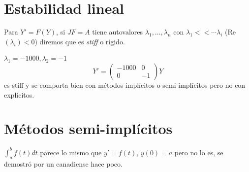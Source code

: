 \section{Estabilidad lineal}
\begin{defi}
Para $Y' = F(Y)$, si $JF=A$ tiene autovalores $\lambda_1, \ldots, \lambda_n$ con $\lambda_1 << \cdots \lambda_i$ (Re$(\lambda_i)<0$) diremos que es \textit{stiff} o r\'igido. 
\end{defi}
\begin{ejem}
    $\lambda_1=-1000, \lambda_2=-1$
    $$Y' = \begin{pmatrix}
        -1000 & 0 \\ 0 & -1
    \end{pmatrix} Y$$
    es stiff y se comporta bien con m\'etodos impl\'icitos o semi-impl\'icitos pero no con expl\'icitos.
\end{ejem}
\section{M\'etodos semi-impl\'icitos}
$\displaystyle \int_a^b f(t) dt $ parece lo mismo que $y'=f(t), \, y(0)=a$ pero no lo es, se demostr\'o por un canadiense hace poco.
\newpage


